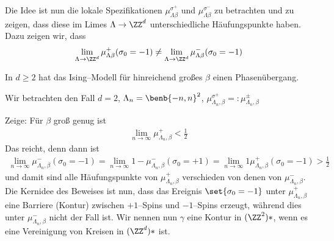 
Die Idee ist nun die lokale Spezifikationen $\mu_{\Lambda\beta}^{\sigma^+}$ und $\mu_{\Lambda\beta}^{\sigma^-}$ zu betrachten und zu zeigen, dass diese im Limes $\Lambda \to \ZZ^d$ unterschiedliche Häufungspunkte haben. Dazu zeigen wir, dass 
\begin{align}
	\lim\limits_{\Lambda \to \ZZ^d} \mu_{\Lambda \beta}^+ (\sigma_0 = -1) \neq \lim\limits_{\Lambda \to \ZZ^d} \mu_{\Lambda \beta}^- (\sigma_0 = -1) 
\end{align}
\begin{satz}[Peierls 1936]
	In $d \geq 2$ hat das Ising--Modell für hinreichend großes $\beta$ einen Phasenübergang. 
\end{satz}
\begin{beweis}
	Wir betrachten den Fall $d=2$, $\Lambda_n = \benb{-n,n}^2$, $\mu_{\Lambda_n, \beta}^{\sigma^{\pm}} =: \mu_{\Lambda_n, \beta}^{\pm}$
	
	Zeige: Für $\beta$ groß genug ist 
	\begin{align}
		\lim\limits_{n \to \infty }\mu_{\Lambda_n, \beta}^{+} < \frac{1}{2}
	\end{align}
	Das reicht, denn dann ist
	\begin{align}
		\lim\limits_{n \to \infty} \mu_{\Lambda_n, \beta}^{-} (\sigma_0 = -1) = \lim\limits_{n \to \infty} 1 - \mu_{\Lambda_n, \beta}^{-} (\sigma_0 = +1) = \lim\limits_{n \to \infty} 1 \mu_{\Lambda_n, \beta}^{+} (\sigma_0  = -1) > \frac{1}{2}
	\end{align}
	und damit sind alle Häufungspunkte von $\mu_{\Lambda_n, \beta}^{+}$ verschieden von denen von $\mu_{\Lambda_n, \beta}^{-}$.
	Die Kernidee des Beweises ist nun, dass das Ereignis $\set{\sigma_0 = -1}$ unter $\mu_{\Lambda_n, \beta}^{+}$ eine Barriere (Kontur) zwischen $+1$--Spins und $-1$--Spins erzeugt, während dies unter $\mu_{\Lambda_n, \beta}^{-}$ nicht der Fall ist. Wir nennen nun $\gamma$ eine Kontur in $(\ZZ^2)*$, wenn es eine Vereinigung von Kreisen in $(\ZZ^d)*$ ist. 
	

\end{beweis}
